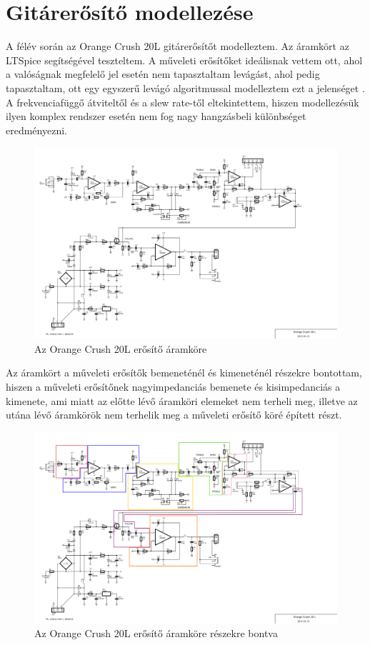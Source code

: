 \chapter{Gitárerősítő modellezése}
A félév során az Orange Crush 20L gitárerősítőt modelleztem. Az áramkört az LTSpice segítségével teszteltem. A műveleti erősítőket ideálisnak vettem ott, ahol a valóságnak megfelelő jel esetén nem tapasztaltam levágást, ahol pedig tapasztaltam, ott egy egyszerű levágó algoritmussal modelleztem ezt a jelenséget \cite{opampo}. A frekvenciafüggő átviteltől és a slew rate-től eltekintettem, hiszen modellezésük ilyen komplex rendszer esetén nem fog nagy hangzásbeli különbséget eredményezni.
\begin{figure}[H]
    \centering
    \includegraphics[scale=0.50]{figures/orange_crush_20l_guitar_amp_sch-1.png}
    \caption{Az Orange Crush 20L erősítő áramköre}
\end{figure}

Az áramkört a műveleti erősítők bemeneténél és kimeneténél részekre bontottam, hiszen a műveleti erősítőnek 
nagyimpedanciás bemenete és kisimpedanciás a kimenete, ami miatt az előtte lévő áramköri elemeket nem terheli 
meg, illetve az utána lévő áramkörök nem terhelik meg a műveleti erősítő köré épített részt.
\begin{figure}[H]
    \centering
    \includegraphics[scale=0.50]{figures/orange_crush_20l_guitar_amp_sch_parts-1.png}
    \caption{Az Orange Crush 20L erősítő áramköre részekre bontva}
\end{figure}
